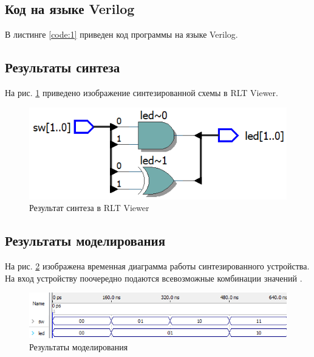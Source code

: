 \subsection{Код на языке Verilog}

В листинге \ref{code:1} приведен код программы на языке Verilog.



\subsection{Результаты синтеза}

На рис. \ref{fig:elab1_1_rtl} приведено изображение синтезированной схемы в RLT Viewer.

\begin{figure}[H]
\begin{center}
	\includegraphics[scale=0.7]{elab1_1_rtl}
	\caption{Результат синтеза в RLT Viewer}
	\label{fig:elab1_1_rtl}
\end{center}
\end{figure}

\subsection{Результаты моделирования}
\label{sec:elab1_1_modeling}

На рис. \ref{fig:elab1_1_modeling} изображена временная диаграмма работы синтезированного устройства. На вход устройству поочередно подаются всевозможные комбинации значений .
\begin{figure}[H]
\begin{center}
	\includegraphics[width=\textwidth]{elab1_1_modeling}
	\caption{Результаты моделирования}
	\label{fig:elab1_1_modeling}
\end{center}
\end{figure}

